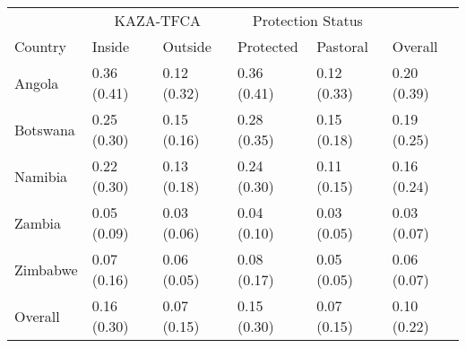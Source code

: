 \begin{table}[!h]
\centering
\begin{tabular}{llllll}
\toprule
\multicolumn{1}{c}{ } & \multicolumn{2}{c}{KAZA-TFCA} & \multicolumn{2}{c}{Protection Status} & \multicolumn{1}{c}{ } \\
\cmidrule(l{3pt}r{3pt}){2-3} \cmidrule(l{3pt}r{3pt}){4-5}
Country & Inside & Outside & Protected & Pastoral & Overall\\
\midrule
Angola & 0.36 (0.41) & 0.12 (0.32) & 0.36 (0.41) & 0.12 (0.33) & 0.20 (0.39)\\
Botswana & 0.25 (0.30) & 0.15 (0.16) & 0.28 (0.35) & 0.15 (0.18) & 0.19 (0.25)\\
Namibia & 0.22 (0.30) & 0.13 (0.18) & 0.24 (0.30) & 0.11 (0.15) & 0.16 (0.24)\\
Zambia & 0.05 (0.09) & 0.03 (0.06) & 0.04 (0.10) & 0.03 (0.05) & 0.03 (0.07)\\
Zimbabwe & 0.07 (0.16) & 0.06 (0.05) & 0.08 (0.17) & 0.05 (0.05) & 0.06 (0.07)\\
\hline
Overall & 0.16 (0.30) & 0.07 (0.15) & 0.15 (0.30) & 0.07 (0.15) & 0.10 (0.22)\\
\bottomrule
\end{tabular}
\end{table}

